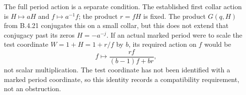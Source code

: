 The full period action is a separate condition. The established
first collar action is $H\mapsto aH$ and $f\mapsto a^{-1}f$;
the product $r=fH$ is fixed. The product $G(q,H)$ from B.4.21
conjugates this on a small collar, but this does not extend that
conjugacy past its zeros $H=-a^{-j}$. If an actual marked period
were to scale the test coordinate $W=1+H=1+r/f$ by $b$, its
required action on $f$ would be
\[
 f\longmapsto\frac{rf}{(b-1)f+br},
\]
not scalar multiplication. The test coordinate has not been
identified with a marked period coordinate, so this identity
records a compatibility requirement, not an obstruction.
